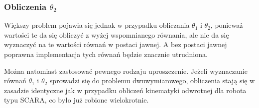 





\subsubsection{Obliczenia $\theta_2$}
Większy problem pojawia się jednak w przypadku obliczania $\theta_1$ i $\theta_2$, ponieważ wartości te da się obliczyć z wyżej wspomnianego równania, ale nie da się wyznaczyć na te wartości równań w postaci jawnej. A bez postaci jawnej poprawna implementacja tych równań będzie znacznie utrudniona.

Można natomiast zastosować pewnego rodzaju uproszczenie. Jeżeli wyznaczanie równań $\theta_1$ i $\theta_2$ sprowadzi się do problemu dwuwymiarowego, obliczenia stają się w zasadzie identyczne jak w przypadku obliczeń kinematyki odwrotnej dla robota typu SCARA, co było już robione wielokrotnie. \cite{SCARA_model}\\

